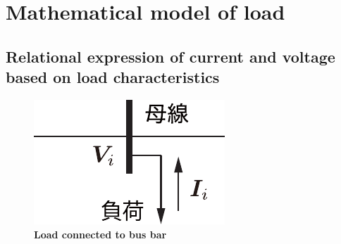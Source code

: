 \documentclass[graybox, envcountchap]{svmult}
\begin{document}
\section{Mathematical model of load}\label{sec:modload}

\subsection{Relational expression of current and voltage based on load characteristics}\label{sec:loadpr}

\begin{figure}[t]
\centering
\includegraphics[width = .25\linewidth]{figs/loadbus}
\medskip
\caption{\textbf{Load connected to bus bar}}
\label{fig:loadbus}
\medskip
\end{figure}
\end{document}
